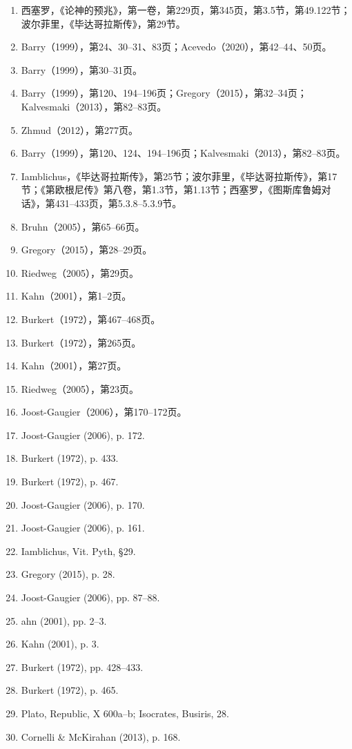 \begin{enumerate}
\item 西塞罗，《论神的预兆》，第一卷，第229页，第345页，第3.5节，第49.122节；波尔菲里，《毕达哥拉斯传》，第29节。  
\item Barry（1999），第24、30–31、83页；Acevedo（2020），第42–44、50页。  
\item Barry（1999），第30–31页。  
\item Barry（1999），第120、194–196页；Gregory（2015），第32–34页；Kalvesmaki（2013），第82–83页。  
\item Zhmud（2012），第277页。  
\item Barry（1999），第120、124、194–196页；Kalvesmaki（2013），第82–83页。  
\item Iamblichus，《毕达哥拉斯传》，第25节；波尔菲里，《毕达哥拉斯传》，第17节；《第欧根尼传》第八卷，第1.3节，第1.13节；西塞罗，《图斯库鲁姆对话》，第431–433页，第5.3.8–5.3.9节。  
\item Bruhn（2005），第65–66页。  
\item Gregory（2015），第28–29页。  
\item Riedweg（2005），第29页。  
\item Kahn（2001），第1–2页。  
\item Burkert（1972），第467–468页。  
\item Burkert（1972），第265页。  
\item Kahn（2001），第27页。  
\item Riedweg（2005），第23页。  
\item Joost-Gaugier（2006），第170–172页。
\item Joost-Gaugier (2006), p. 172.  
\item Burkert (1972), p. 433.  
\item Burkert (1972), p. 467.  
\item Joost-Gaugier (2006), p. 170.  
\item Joost-Gaugier (2006), p. 161.  
\item Iamblichus, Vit. Pyth, §29.  
\item Gregory (2015), p. 28.  
\item Joost-Gaugier (2006), pp. 87–88.  
\item ahn (2001), pp. 2–3.  
\item Kahn (2001), p. 3.  
\item Burkert (1972), pp. 428–433.  
\item Burkert (1972), p. 465.  
\item Plato, Republic, X 600a–b; Isocrates, Busiris, 28.  
\item Cornelli & McKirahan (2013), p. 168.  

\end{enumerate}
